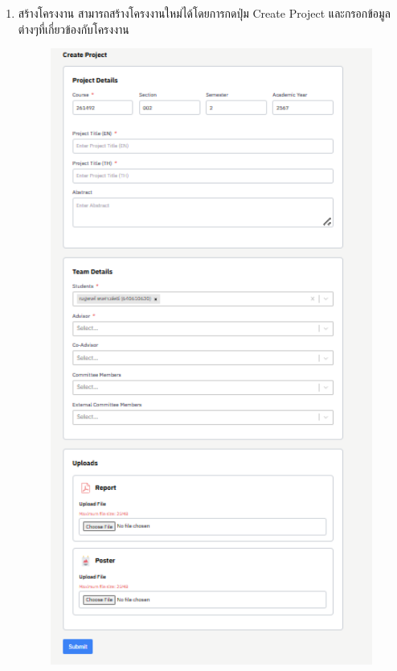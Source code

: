 \begin{itemize}
\begin{enumerate}
\begin{enumerate}
\begin{figure}[H]
        \end{figure} 
    \end{enumerate}
    \item สร้างโครงงาน สามารถสร้างโครงงานใหม่ได้โดยการกดปุ่ม Create Project และกรอกข้อมูลต่างๆที่เกี่ยวข้องกับโครงงาน
    \begin{figure}[H]
        \centering
        \includegraphics[width=130mm, keepaspectratio ]{pictures/project_box/create_project.png}

\end{figure}
\end{enumerate}
\end{itemize}
